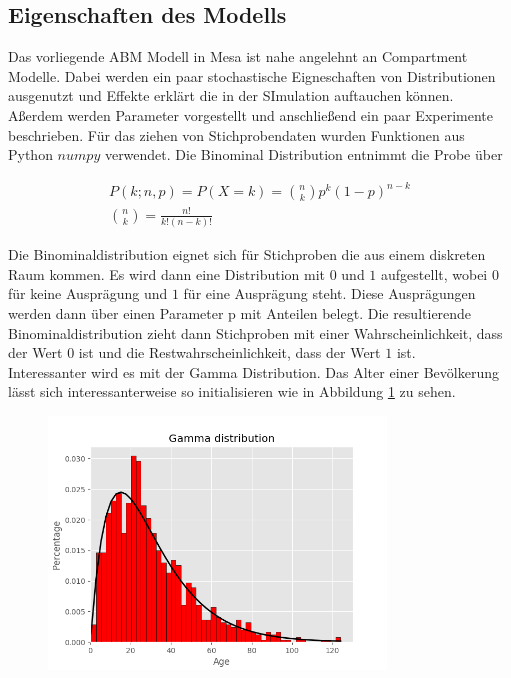 \documentclass[paper=a4, fontsize=11pt, ngerman, abstract=on]{scrartcl}
\numberwithin{equation}{section} %
\numberwithin{figure}{section} %
\numberwithin{table}{section} %
\begin{document}
\subsection{Eigenschaften des Modells}

Das vorliegende ABM Modell in Mesa ist nahe angelehnt an Compartment Modelle. Dabei werden ein paar stochastische Eigneschaften von Distributionen ausgenutzt und Effekte erklärt die in der SImulation auftauchen können. Aßerdem werden Parameter vorgestellt und anschließend ein paar Experimente beschrieben. Für das ziehen von Stichprobendaten wurden Funktionen aus Python $numpy$ verwendet. Die Binominal Distribution entnimmt die Probe über

\begin{gather*}
  P(k; n, p) = P(X = k) = {{n}\choose{k}}p^{k}(1 - p)^{n - k} \\
  {{n}\choose{k}} = \frac{n!}{k!(n-k)!}
\end{gather*}

Die Binominaldistribution eignet sich für Stichproben die aus einem diskreten Raum kommen. Es wird dann eine Distribution mit $0$ und $1$ aufgestellt, wobei $0$ für keine Ausprägung und $1$ für eine Ausprägung steht. Diese Ausprägungen werden dann über einen Parameter p mit Anteilen belegt. Die resultierende Binominaldistribution zieht dann Stichproben mit einer Wahrscheinlichkeit, dass der Wert $0$ ist und die Restwahrscheinlichkeit, dass der Wert $1$ ist. \\

Interessanter wird es mit der Gamma Distribution. Das Alter einer Bevölkerung lässt sich interessanterweise so initialisieren wie in Abbildung \ref{fig:gamma-age-dist} zu sehen.

\begin{figure}[ht]
  \centering
  \includegraphics[width=0.8\textwidth,keepaspectratio]{images/gamma-age-dist}
  \label{fig:gamma-age-dist}
\end{figure}
\end{document}

